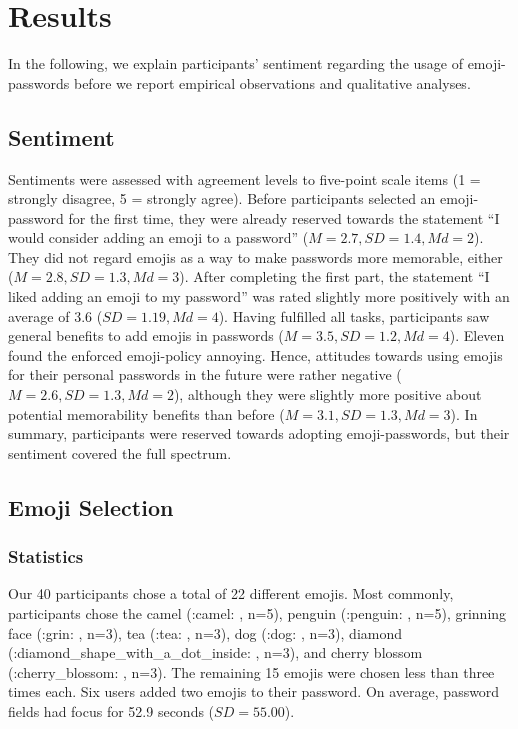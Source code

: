 \section{Results}
In the following, we explain participants' sentiment regarding the usage of emoji-passwords before we report empirical observations and qualitative analyses. 
\subsection{Sentiment}
Sentiments were assessed with agreement levels to five-point scale items (1 = strongly disagree, 5 = strongly agree).
Before participants selected an emoji-password for the first time, they were already reserved towards the statement ``I would consider adding an emoji to a password'' ($M=2.7, SD = 1.4, Md=2$). They did not regard emojis as a way to make passwords more memorable, either ($M=2.8, SD = 1.3, Md=3$).
After completing the first part, the statement ``I liked adding an emoji to my password'' was rated slightly more positively with an average of 3.6 ($SD=1.19, Md=4$). 
Having fulfilled all tasks, participants saw general benefits to add emojis in passwords ($M=3.5, SD = 1.2, Md=4$). Eleven found the enforced emoji-policy annoying. Hence, attitudes towards using emojis for their personal passwords in the future were rather negative ($M=2.6, SD = 1.3, Md=2$), although they were slightly more positive about potential memorability benefits than before ($M=3.1, SD = 1.3, Md=3$). In summary, participants were reserved towards adopting emoji-passwords, but their sentiment covered the full spectrum. 

\subsection{Emoji Selection}
\subsubsection{Statistics}
Our 40 participants chose a total of 22 different emojis. Most commonly, participants chose the camel (:camel: , n=5), penguin (:penguin: , n=5), grinning face (:grin: , n=3), tea (:tea: , n=3), dog (:dog: , n=3), diamond (:diamond\_shape\_with\_a\_dot\_inside: , n=3), and cherry blossom (:cherry\_blossom: , n=3). The remaining 15 emojis were chosen less than three times each. Six users added two emojis to their password. On average, password fields had focus for 52.9 seconds ($SD = 55.00$).

